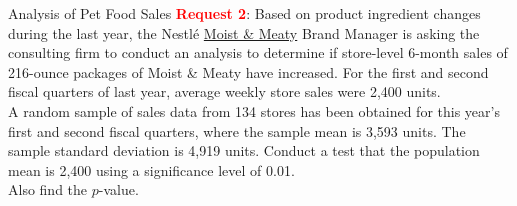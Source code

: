 \documentclass[pdf]{beamer}
\theoremstyle{remark}
\theoremstyle{definition}
\begin{document}
\begin{frame}[t]{Analysis of Pet Food Sales}
\textcolor{red}{\textbf{Request 2}}:  Based on product ingredient changes during the last year, the Nestl\'{e} \href{https://www.purina.com/moist-meaty}{Moist \& Meaty} Brand Manager is asking the consulting firm to conduct an analysis  to determine if store-level 6-month sales of 216-ounce packages of  Moist \& Meaty have increased.  For the first and second fiscal quarters of last year, average weekly store sales were 2,400 units.  \\
\vspace{1.5ex}
A random sample of sales data from 134 stores has been obtained for this year's first and second fiscal quarters, where the sample mean is 3,593 units.  The sample standard deviation is 4,919 units.  Conduct a test that the population mean is 2,400 using a significance level of 0.01.  \\
\vspace{1.5ex}
Also find the $p$-value. 
\end{frame}

\end{document}
